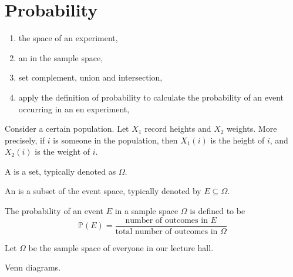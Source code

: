 \documentclass[../main.tex]{subfiles}
\begin{document}
 \section{Probability}

\begin{objective}
  \begin{enumerate}
    \item the  space of an experiment,
    \item an  in the sample space,
    \item set complement, union and intersection,
    \item apply the definition of probability to calculate the probability of an event occurring in an en experiment,
  \end{enumerate}
\end{objective}


Consider a certain population. Let \(X_{1}\) record heights and \(X_{2}\) weights. More precisely, if \(i\) is someone in the population, then \(X_{1}(i)\) is the height of \(i\), and \(X_{2}(i)\) is the weight of \(i\).

\begin{definition}
  A  is a set, typically denoted as \(\Omega\).
\end{definition}

An  is a subset of the event space, typically denoted by \(E \subseteq \Omega\).

The probability of an event \(E\) in a sample space \(\Omega\) is defined to be
\[
  \mathbb{P}(E) = \frac{\text{number of outcomes in \(E\)}}{\text{total number of outcomes in \(\Omega\)}}
\]

\begin{example}
  Let \(\Omega\) be the sample space of everyone in our lecture hall.  
\end{example}

Venn diagrams.
\end{document}

